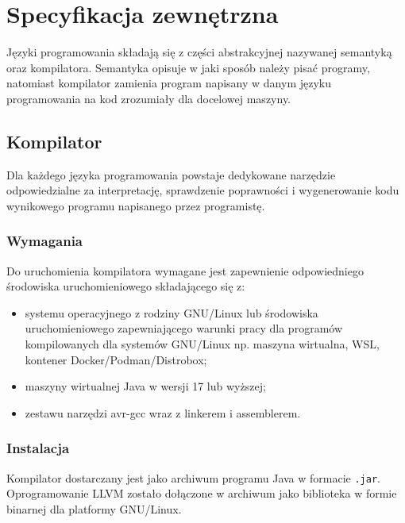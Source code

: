 \chapter{Specyfikacja zewnętrzna}
\label{ch:04}
Języki programowania składają się z części abstrakcyjnej nazywanej semantyką oraz kompilatora. Semantyka opisuje w jaki sposób należy pisać programy, natomiast kompilator zamienia program napisany w danym języku programowania na kod zrozumiały dla docelowej maszyny.
\section{Kompilator}
Dla każdego języka programowania powstaje dedykowane narzędzie odpowiedzialne za interpretację, sprawdzenie poprawności i wygenerowanie kodu wynikowego programu napisanego przez programistę.
\subsection{Wymagania}
Do uruchomienia kompilatora wymagane jest zapewnienie odpowiedniego środowiska uruchomieniowego składającego się z:
\begin{itemize}
\item systemu operacyjnego z rodziny GNU/Linux lub środowiska uruchomieniowego zapewniającego warunki pracy dla programów kompilowanych dla systemów GNU/Linux np. maszyna wirtualna, WSL, kontener Docker/Podman/Distrobox;
\item maszyny wirtualnej Java w wersji 17 lub wyższej;
\item zestawu narzędzi avr-gcc wraz z linkerem i assemblerem.
\end{itemize}

\subsection{Instalacja}
Kompilator dostarczany jest jako archiwum programu Java w formacie \lstinline|.jar|. Oprogramowanie LLVM zostało dołączone w archiwum jako biblioteka w formie binarnej dla platformy GNU/Linux.

